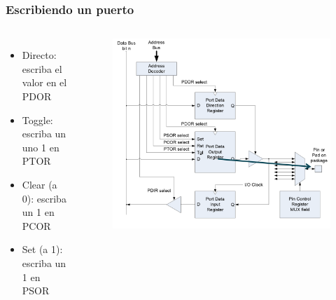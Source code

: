 \documentclass[10.5pt,scale=1.0,t,aspectratio=169,hyperref={pdfpagelabels=false}]{beamer}
\begin{document}
\begin{frame}
	\frametitle{Escribiendo un puerto}
	\begin{columns}
		\begin{itemize}
			\item Directo: escriba el valor en el PDOR
			\item Toggle: escriba un uno 1 en PTOR
			\item Clear (a 0): escriba un 1 en PCOR
			\item Set (a 1): escriba un 1 en PSOR 
		\end{itemize}
		
		\begin{figure}
			\centering
			\includegraphics[scale=0.3]{12_WritingGPIO}
		\end{figure}
	\end{columns}
\end{frame}
\end{document}
